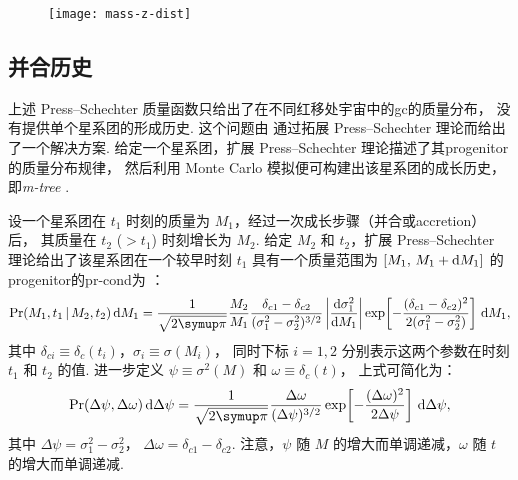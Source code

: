 \begin{figure}[htp]
  \centering
  \texttt{[image: mass-z-dist]}
  \label{fig:m-z-dist}
\end{figure}

\subsection{并合历史}
\label{sec:merging-history}

上述 Press--Schechter 质量函数只给出了在不同红移处宇宙中的\ac{gc}的质量分布，
没有提供单个星系团的形成历史.
这个问题由  通过拓展 Press--Schechter 理论而给出了一个解决方案.
给定一个星系团，扩展 Press--Schechter 理论描述了其\ac{progenitor}的质量分布规律，
然后利用 Monte Carlo 模拟便可构建出该星系团的成长历史，即\emph{\acf{m-tree}}
\cite{lacey1993,randall2002}.

设一个星系团在 $t_1$ 时刻的质量为 $M_1$，经过一次成长步骤（并合或\ac{accretion}）后，
其质量在 $t_2$ ($> t_1$) 时刻增长为 $M_2$.
给定 $M_2$ 和 $t_2$，扩展 Press--Schechter 理论给出了该星系团在一个较早时刻 $t_1$
具有一个质量范围为 $[M_1,\, M_1+\mathrm{d}M_1]$ 的\ac{progenitor}的\ac{pr-cond}为
\cite{lacey1993,randall2002}：
\begin{equation}
  \label{eq:eps-condprob}
  \R{Pr}(M_1, t_1 \,|\, M_2, t_2) \,\D{M_1} =
    \frac{1}{\sqrt{2\Cpi}} \frac{M_2}{M_1}
    \frac{\delta_{c1} - \delta_{c2}}{(\sigma_1^2 - \sigma_2^2)^{3/2}}
    \left| \diff{\sigma_1^2}{M_1} \right|
    \exp \!\left[ -\frac{(\delta_{c1} - \delta_{c2})^2}
      {2(\sigma_1^2 - \sigma_2^2)} \right] \,\D{M_1} ,
\end{equation}
其中
$\delta_{ci} \equiv \delta_c(t_i)$，$\sigma_i \equiv \sigma(M_i)$，
同时下标 $i = 1, 2$ 分别表示这两个参数在时刻 $t_1$ 和 $t_2$ 的值.
进一步定义 $\psi \equiv \sigma^2(M)$ 和 $\omega \equiv \delta_c(t)$，
上式可简化为：
\begin{equation}
  \label{eq:eps-condprob2}
  \R{Pr}(\Delta\psi, \Delta\omega) \,\D{\Delta\psi} =
    \frac{1}{\sqrt{2\Cpi}} \frac{\Delta\omega}{(\Delta\psi)^{3/2}}
    \exp \!\left[ -\frac{(\Delta\omega)^2}{2 \Delta\psi} \right]
    \,\D{\Delta\psi} ,
\end{equation}
其中
$\Delta\psi = \sigma_1^2 - \sigma_2^2$，
$\Delta\omega = \delta_{c1} - \delta_{c2}$.
注意，$\psi$ 随 $M$ 的增大而单调递减，$\omega$ 随 $t$ 的增大而单调递减.

